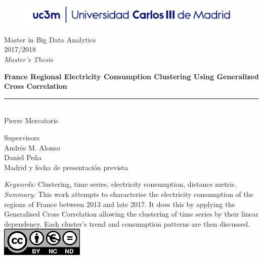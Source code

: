 \begin{titlepage}
\begin{sffamily}
\color{azulUC3M}
\begin{center}
\begin{figure}[htb]
\begin{center}
\vspace*{0.6cm}
\includegraphics[width=15cm]{./latex/imagenes/Portada_Logo.png}
\vspace*{1.6cm}
\end{center}
\end{figure}
\begin{LARGE}
Master in Big Data Analytics \\%
2017/2018 \\%
\vspace*{1cm}
\textsl{Master's Thesis}\\
\end{LARGE}
\Huge{\textbf{France Regional Electricity Consumption Clustering Using Generalized Cross Correlation}} %
\vspace*{1cm}
\rule{80mm}{0.1mm}\\
\huge{Pierre Mercatoris}\\ %
\vspace*{0.5cm}
\begin{Large}
Supervisors\\

Andrés M. Alonso\\
Daniel Peña\\
Madrid y fecha de presentación prevista\\
\end{Large}
\end{center}
\vspace*{2cm}
\color{black}
\emph{Keywords:} Clustering, time series, electricity consumption, distance metric. \\
\emph{Summary:} This work attempts to characterise the electricity consumption
of the regions of France between 2013 and late 2017. It does this by applying
the Generalised Cross Correlation allowing the clustering of time series by
their linear dependency. Each cluster's trend and consumption patterns are then discussed.\\
\includegraphics{./latex/imagenes/creativecommons.png}\\


\end{sffamily}
\end{titlepage}
